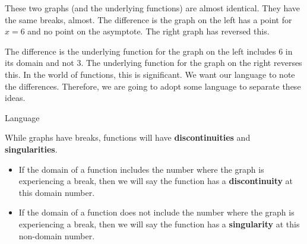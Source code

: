 \documentclass{ximera}
\begin{document}
\begin{image}
\end{image}


These two graphs (and the underlying functions) are almost identical. They have the same breaks, almost. The difference is the graph on the left has a point for $x=6$ and no point on the asymptote.  The right graph has reversed this.

The difference is the underlying function for the graph on the left includes $6$ in its domain and not $3$. The underlying function for the graph on the right reverses this. In the world of functions, this is significant.  We want our language to note the differences. Therefore, we are going to adopt some language to separate these ideas.


\begin{idea} Language 


While graphs have breaks, functions will have \textbf{\textcolor{green!50!black}{discontinuities}} and \textbf{\textcolor{green!50!black}{singularities}}.

\begin{itemize}
\item If the domain of a function includes the number where the graph is experiencing a break, then we will say the function has a \textbf{\textcolor{green!50!black}{discontinuity}} at this domain number.  

\item If the domain of a function does not include the number where the graph is experiencing a break, then we will say the function has a \textbf{\textcolor{green!50!black}{singularity}} at this non-domain number.
\end{itemize}

\end{idea}
\end{document}
